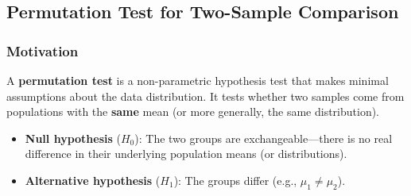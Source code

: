 \documentclass[10pt]{extarticle}
\begin{document}
\subsection{Permutation Test for Two-Sample Comparison}

\subsubsection{Motivation}
A \textbf{permutation test} is a non-parametric hypothesis test that makes minimal assumptions about the data distribution. It tests whether two samples come from populations with the \textbf{same} mean (or more generally, the same distribution).
\begin{itemize}
    \item \textbf{Null hypothesis} ($H_0$): The two groups are exchangeable---there is no real difference in their underlying population means (or distributions).
    \item \textbf{Alternative hypothesis} ($H_1$): The groups differ (e.g., $\mu_1 \neq \mu_2$).
\end{itemize}
\end{document}
